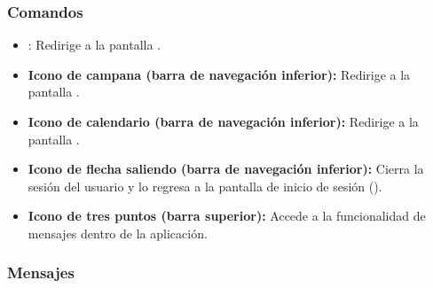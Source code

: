 \subsubsection{Comandos}
\begin{itemize}
	\item {}: Redirige a la pantalla .
	\item \textbf{Icono de campana (barra de navegación inferior):} Redirige a la pantalla .
	\item \textbf{Icono de calendario (barra de navegación inferior):} Redirige a la pantalla .
	\item \textbf{Icono de flecha saliendo (barra de navegación inferior):} Cierra la sesión del usuario y lo regresa a la pantalla de inicio de sesión ().
	\item \textbf{Icono de tres puntos (barra superior):} Accede a la funcionalidad de mensajes dentro de la aplicación.
\end{itemize}

\subsubsection{Mensajes}

